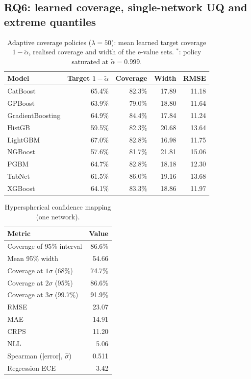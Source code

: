 \documentclass[11pt]{article}
\begin{document}
\subsection{RQ6: learned coverage, single-network UQ and extreme quantiles}
\begin{table}[t]\centering\small
\caption{Adaptive coverage policies ($\lambda=50$): mean learned target coverage $1-\tilde\alpha$, realised coverage and width of the e-value sets. $^\ast$: policy saturated at $\tilde\alpha=0.999$.}\label{tab:acp}
\begin{tabular}{lrrrr}\toprule Model & Target $1-\tilde\alpha$ & Coverage & Width & RMSE\\\midrule
CatBoost & 65.4\% & 82.3\% & 17.89 & 11.18\\
GPBoost & 63.9\% & 79.0\% & 18.80 & 11.64\\
GradientBoosting & 64.9\% & 84.4\% & 17.84 & 11.24\\
HistGB & 59.5\% & 82.3\% & 20.68 & 13.64\\
LightGBM & 67.0\% & 82.8\% & 16.98 & 11.75\\
NGBoost & 57.6\% & 81.7\% & 21.81 & 15.06\\
PGBM & 64.7\% & 82.8\% & 18.18 & 12.30\\
TabNet & 61.5\% & 86.0\% & 19.16 & 13.68\\
XGBoost & 64.1\% & 83.3\% & 18.86 & 11.97\\
\bottomrule\end{tabular}\end{table}
\begin{table}[t]\centering\small
\caption{Hyperspherical confidence mapping (one network).}\label{tab:hcm}
\begin{tabular}{lr}\toprule Metric & Value\\\midrule
Coverage of 95\% interval & 86.6\%\\
Mean 95\% width & 54.66\\
Coverage at $1\sigma$ (68\%) & 74.7\%\\
Coverage at $2\sigma$ (95\%) & 86.6\%\\
Coverage at $3\sigma$ (99.7\%) & 91.9\%\\
RMSE & 23.07\\
MAE & 14.91\\
CRPS & 11.20\\
NLL & 5.06\\
Spearman (|error|, $\hat\sigma$) & 0.511\\
Regression ECE & 3.42\\
\bottomrule\end{tabular}\end{table}
\end{document}
